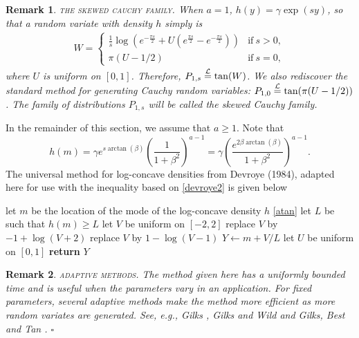 \documentclass[12pt,reqno,tbtags]{amsart}
\newcommand{\inlaw}{\buildrel {\mathcal L} \over =}
\newtheorem{remark}{Remark}
\begin{document}
\begin{remark}
    \textsc{the skewed cauchy family.}
When $a=1$, $h(y) = \gamma \exp(sy)$, so that a random variate with density $h$ simply is
\begin{align}\label{skewedcauchy}
W = 
\begin{cases}
\frac{1 }{ s} \log \left( e^{-\frac{\pi s }{ 2}} + U \left( e^{\frac{\pi s }{ 2}} - e^{-\frac{\pi s }{ 2}} \right) \right) & \text{if}~s > 0, \\
\pi (U-1/2) & \text{if}~s = 0, 
\end{cases}
\end{align}
where $U$ is uniform on $[0,1]$. Therefore, $P_{1,s} \inlaw \tan (W)$. 
We also rediscover the standard method
for generating Cauchy random variables: $P_{1,0} \inlaw \tan (\pi (U-1/2))$.
The family of distributions  $P_{1,s}$  will be called the skewed Cauchy family. 
\end{remark}


In the remainder of this section, we assume that $a \ge 1$. Note that
$$
h(m) 
= \gamma e^{s \arctan (\beta) } \left(\frac{1 }{ 1+ \beta^2} \right)^{a-1}
= \gamma \left( \frac{ e^{2 \beta \arctan (\beta)}}  { 1+ \beta^2} \right)^{a-1}.
$$
The universal method for log-concave densities
from Devroye (1984)\cite{D4}, adap\-ted here for use with  the inequality %
based on \eqref{devroye2} is given below

\begin{algorithm}[H]
\caption{Universal log-concave method: $a \ge 1$}\label{LC}
\begin{algorithmic}[1]
\State let $m$ be the location of the mode of the log-concave density $h$ \eqref{atan}
\State let $L$ be such that $h(m) \ge L$
\Repeat  
\State let $V$ be uniform on $[-2,2]$ 
\State replace $V$ by $-1 + \log(V+2)$ 
\State replace $V$  by $1 - \log(V-1)$ 
\EndIf
\State $Y \gets m + V/L$ 
\State let $U$ be uniform on $[0,1]$ 
\State \textbf {return} $Y$ 
\State {}
\Comment        {$\tan(Y) \inlaw P_{a,s}$ if $h$ is as in \eqref{atan}}
\end{algorithmic}
\end{algorithm}


\begin{remark}
    \textsc{adaptive methods.}  The method given here has a uniformly bounded
time and is useful when the parameters vary in an application. For fixed parameters, several adaptive methods make the method more efficient as more random variates
are generated. See, e.g., Gilks \cite{G1}, Gilks and Wild \cite{GW1, GW2} and Gilks, Best and Tan \cite{GBT}. $\square$
\end{remark}
\end{document}
